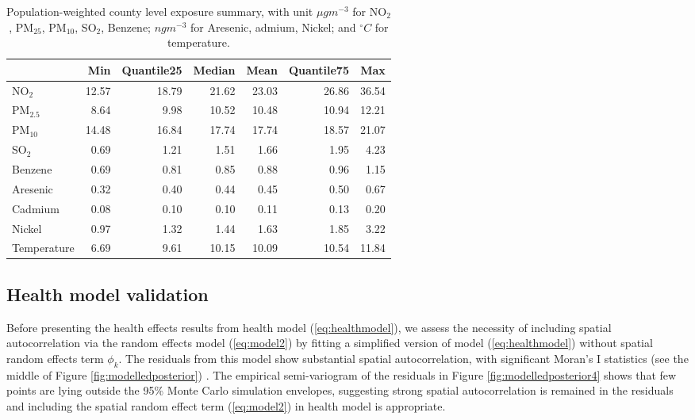 \documentclass[12,]{article}
\begin{document}
\begin{table}

\caption{\label{tab:dataTable}Population-weighted county level exposure summary, with unit $\mu g m^{-3}$ for NO$_2$, PM$_{25}$, PM$_{10}$, SO$_2$, Benzene; $ng m^{-3}$ for Aresenic, admium, Nickel; and $^{\circ}C$  for temperature.}
\centering
\begin{tabular}[t]{lrrrrrr}
\toprule
 & \textbf{Min} & \textbf{Quantile25} & \textbf{Median} & \textbf{Mean} & \textbf{Quantile75} & \textbf{Max}\\
\midrule
NO$_2$ & 12.57 & 18.79 & 21.62 & 23.03 & 26.86 & 36.54\\
PM$_{2.5}$ & 8.64 & 9.98 & 10.52 & 10.48 & 10.94 & 12.21\\
PM$_{10}$ & 14.48 & 16.84 & 17.74 & 17.74 & 18.57 & 21.07\\
SO$_2$ & 0.69 & 1.21 & 1.51 & 1.66 & 1.95 & 4.23\\
Benzene & 0.69 & 0.81 & 0.85 & 0.88 & 0.96 & 1.15\\
Aresenic & 0.32 & 0.40 & 0.44 & 0.45 & 0.50 & 0.67\\
Cadmium & 0.08 & 0.10 & 0.10 & 0.11 & 0.13 & 0.20\\
Nickel & 0.97 & 1.32 & 1.44 & 1.63 & 1.85 & 3.22\\
Temperature & 6.69 & 9.61 & 10.15 & 10.09 & 10.54 & 11.84\\
\bottomrule
\end{tabular}
\end{table}

\hypertarget{health-model-validation}{%
\subsection{Health model validation}\label{health-model-validation}}

Before presenting the health effects results from health model
(\ref{eq:healthmodel}), we assess the necessity of including spatial
autocorrelation via the random effects model (\ref{eq:model2}) by
fitting a simplified version of model (\ref{eq:healthmodel}) without
spatial random effects term \(\phi_k\). The residuals from this model
show substantial spatial autocorrelation, with significant Moran's I
statistics (see the middle of Figure \ref{fig:modelledposterior})
\autocite{Moran1950}. The empirical semi-variogram of the residuals in
Figure \ref{fig:modelledposterior4} shows that few points are lying
outside the 95\% Monte Carlo simulation envelopes, suggesting strong
spatial autocorrelation is remained in the residuals and including the
spatial random effect term (\ref{eq:model2}) in health model is
appropriate.
\end{document}
